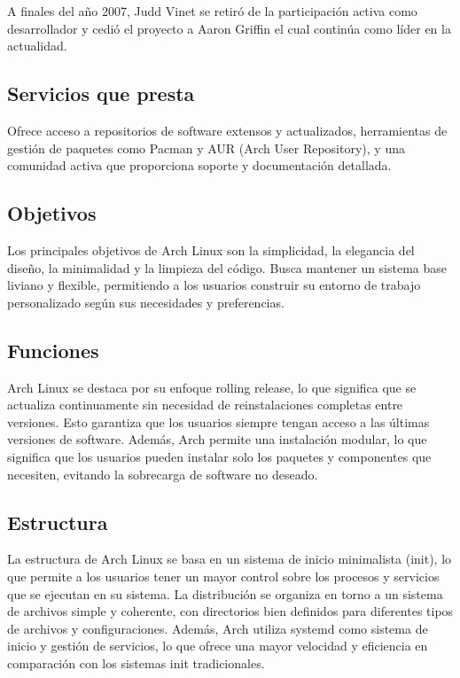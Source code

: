 \documentclass[12pt, a4paper]{article} %
\begin{document}
A finales del año 2007, Judd Vinet se retiró de la participación activa como desarrollador y cedió el proyecto a Aaron Griffin el cual continúa como líder en la actualidad.

\subsection{Servicios que presta}

Ofrece acceso a repositorios de software extensos y actualizados, herramientas de gestión de paquetes como Pacman y AUR (Arch User Repository), y una comunidad activa que proporciona soporte y documentación detallada.

\subsection{Objetivos}

Los principales objetivos de Arch Linux son la simplicidad, la elegancia del diseño, la minimalidad y la limpieza del código. Busca mantener un sistema base liviano y flexible, permitiendo a los usuarios construir su entorno de trabajo personalizado según sus necesidades y preferencias.

\subsection{Funciones}

Arch Linux se destaca por su enfoque rolling release, lo que significa que se actualiza continuamente sin necesidad de reinstalaciones completas entre versiones. Esto garantiza que los usuarios siempre tengan acceso a las últimas versiones de software. Además, Arch permite una instalación modular, lo que significa que los usuarios pueden instalar solo los paquetes y componentes que necesiten, evitando la sobrecarga de software no deseado.

\subsection{Estructura}

La estructura de Arch Linux se basa en un sistema de inicio minimalista (init), lo que permite a los usuarios tener un mayor control sobre los procesos y servicios que se ejecutan en su sistema. La distribución se organiza en torno a un sistema de archivos simple y coherente, con directorios bien definidos para diferentes tipos de archivos y configuraciones. Además, Arch utiliza systemd como sistema de inicio y gestión de servicios, lo que ofrece una mayor velocidad y eficiencia en comparación con los sistemas init tradicionales.
\end{document}
